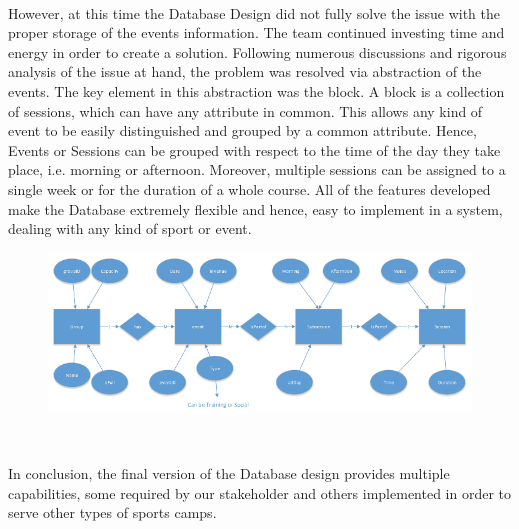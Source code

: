 \documentclass{l3proj}
\begin{document}
\\ However, at this time the Database Design did not fully solve the issue with the proper storage of the events information. The team continued investing time and energy in order to create a solution. Following numerous discussions and rigorous analysis of the issue at hand, the problem was resolved via abstraction of the events. The key element in this abstraction was the block. A block is a collection of sessions, which can have any attribute in common. This allows any kind of event to be easily distinguished and grouped by a common attribute. Hence, Events or Sessions can be grouped with respect to the time of the day they take place, i.e. morning or afternoon. Moreover, multiple sessions can be assigned to a single week or for the duration of a whole course. All of the features developed make the Database extremely flexible and hence, easy to implement in a system, dealing with any kind of sport or event.
\\
{
\begin{figure}[h]
\centering
\includegraphics[scale=0.8]{ERDiagram.png}
\end{figure}
}
\\
\par In conclusion, the final version of the Database design provides multiple capabilities, some required by our stakeholder and others implemented in order to  serve other types of sports camps. \\

\end{document}
